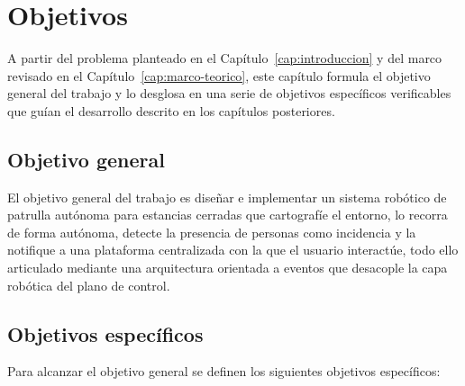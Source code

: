 \chapter{Objetivos}
\label{cap:objetivos}

A partir del problema planteado en el Capítulo~\ref{cap:introduccion} y del
marco revisado en el Capítulo~\ref{cap:marco-teorico}, este capítulo formula el
objetivo general del trabajo y lo desglosa en una serie de objetivos específicos
verificables que guían el desarrollo descrito en los capítulos posteriores.

\section{Objetivo general}
\label{sec:objetivo-general}

El objetivo general del trabajo es diseñar e implementar un sistema
robótico de patrulla autónoma para estancias cerradas que cartografíe el
entorno, lo recorra de forma autónoma, detecte la presencia de personas como
incidencia y la notifique a una plataforma centralizada con la que el usuario
interactúe, todo ello articulado mediante una arquitectura orientada a eventos
que desacople la capa robótica del plano de control.

\section{Objetivos específicos}
\label{sec:objetivos-especificos}

Para alcanzar el objetivo general se definen los siguientes objetivos
específicos:

